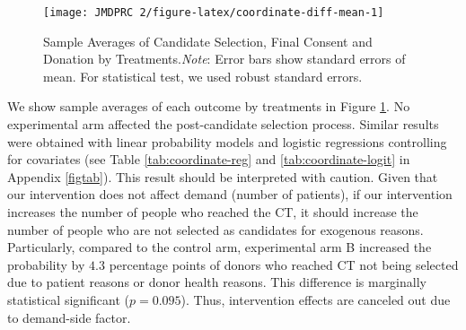 \documentclass[12pt, a4paper]{article}
\begin{document}
\begin{figure}[t]
\texttt{[image: JMDPRC~2/figure-latex/coordinate-diff-mean-1]} \caption{Sample Averages of Candidate Selection, Final Consent and Donation by Treatments.\newline \emph{Note}: Error bars show standard errors of mean. For statistical test, we used robust standard errors.}\label{fig:coordinate-diff-mean}
\end{figure}

We show sample averages of each outcome by treatments in Figure \ref{fig:coordinate-diff-mean}. No experimental arm affected the post-candidate selection process. Similar results were obtained with linear probability models and logistic regressions controlling for covariates (see Table \ref{tab:coordinate-reg} and \ref{tab:coordinate-logit} in Appendix \ref{figtab}). This result should be interpreted with caution. Given that our intervention does not affect demand (number of patients), if our intervention increases the number of people who reached the CT, it should increase the number of people who are not selected as candidates for exogenous reasons. Particularly, compared to the control arm, experimental arm B increased the probability by \(4.3\) percentage points of donors who reached CT not being selected due to patient reasons or donor health reasons. This difference is marginally statistical significant (\(p = 0.095\)). Thus, intervention effects are canceled out due to demand-side factor.
\end{document}
